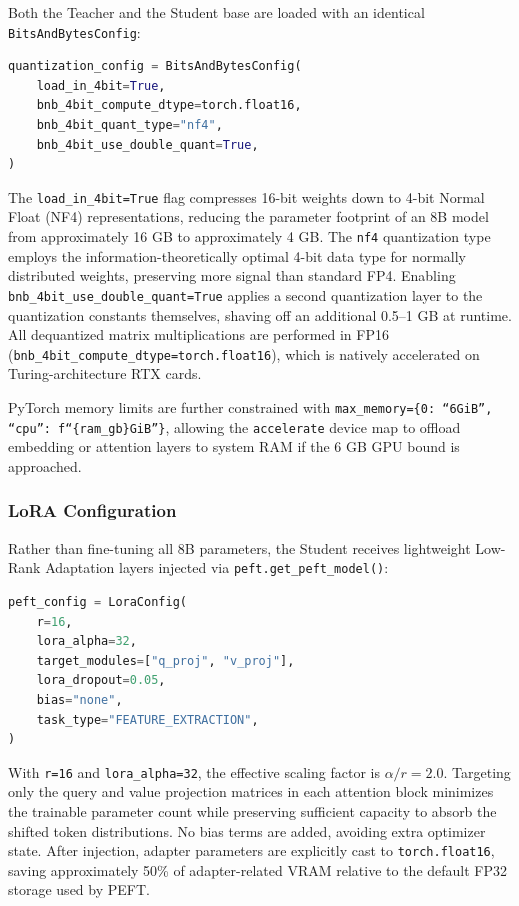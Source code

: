 \documentclass[11pt, a4paper]{article}
\begin{document}
Both the Teacher and the Student base are loaded with an identical \texttt{BitsAndBytesConfig}:

\begin{lstlisting}[language=Python]
quantization_config = BitsAndBytesConfig(
    load_in_4bit=True,
    bnb_4bit_compute_dtype=torch.float16,
    bnb_4bit_quant_type="nf4",
    bnb_4bit_use_double_quant=True,
)
\end{lstlisting}

\begin{sloppypar}
The \texttt{load\_in\_4bit=True} flag compresses 16-bit weights down to 4-bit Normal Float (NF4) representations, reducing the parameter footprint of an 8B model from approximately 16 GB to approximately 4 GB. The \texttt{nf4} quantization type employs the information-theoretically optimal 4-bit data type for normally distributed weights, preserving more signal than standard FP4. Enabling \texttt{bnb\_4bit\_use\_double\_quant=True} applies a second quantization layer to the quantization constants themselves, shaving off an additional 0.5--1 GB at runtime. All dequantized matrix multiplications are performed in FP16 (\texttt{bnb\_4bit\_compute\_dtype=torch.float16}), which is natively accelerated on Turing-architecture RTX cards.

PyTorch memory limits are further constrained with \texttt{max\_memory=\{0: ``6GiB'', ``cpu'': f``\{ram\_gb\}GiB''\}}, allowing the \texttt{accelerate} device map to offload embedding or attention layers to system RAM if the 6 GB GPU bound is approached.
\end{sloppypar}

\subsubsection{LoRA Configuration}

Rather than fine-tuning all 8B parameters, the Student receives lightweight Low-Rank Adaptation layers injected via \texttt{peft.get\_peft\_model()}:

\begin{lstlisting}[language=Python]
peft_config = LoraConfig(
    r=16,
    lora_alpha=32,
    target_modules=["q_proj", "v_proj"],
    lora_dropout=0.05,
    bias="none",
    task_type="FEATURE_EXTRACTION",
)
\end{lstlisting}

With \texttt{r=16} and \texttt{lora\_alpha=32}, the effective scaling factor is $\alpha / r = 2.0$. Targeting only the query and value projection matrices in each attention block minimizes the trainable parameter count while preserving sufficient capacity to absorb the shifted token distributions. No bias terms are added, avoiding extra optimizer state. After injection, adapter parameters are explicitly cast to \texttt{torch.float16}, saving approximately 50\% of adapter-related VRAM relative to the default FP32 storage used by PEFT.
\end{document}
